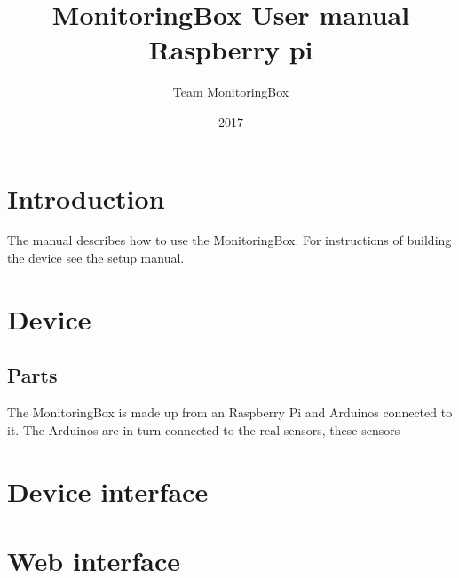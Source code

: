 \documentclass[11pt]{report}
\title{\textbf{MonitoringBox User manual}\\Raspberry pi}
\author{Team MonitoringBox}
\date{2017}
\begin{document}


\maketitle

\tableofcontents{}

\chapter{Introduction}
	The manual describes how to use the MonitoringBox. For instructions of building the device see the setup manual.
\chapter{Device}
	\section{Parts}
		The MonitoringBox is made up from an Raspberry Pi and Arduinos connected to it. The Arduinos are in turn connected to the real sensors, these sensors
\chapter{Device interface}
\chapter{Web interface}
\end{document}
